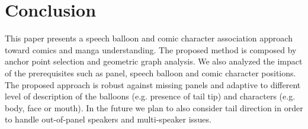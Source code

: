 \documentclass[conference]{IEEEtran}
\begin{document}


\section{Conclusion}
\label{sec:conclusion}
  
This paper presents a speech balloon and comic character association approach toward comics and manga understanding.
The proposed method is composed by anchor point selection and geometric graph analysis.
We also analyzed the impact of the prerequisites such as panel, speech balloon and comic character positions.
The proposed approach is robust against missing panels and adaptive to different level of description of the balloons (e.g. presence of tail tip) and characters (e.g. body, face or mouth).
In the future we plan to also consider tail direction in order to handle out-of-panel speakers and multi-speaker issues.
\end{document}
